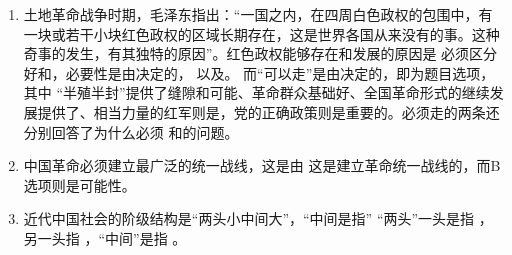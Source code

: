 \begin{enumerate}[align=hang, start=1]
	
	\item 
	土地革命战争时期，毛泽东指出：``一国之内，在四周白色政权的包围中，有一块或若干小块红色政权的区域长期存在，这是世界各国从来没有的事。这种奇事的发生，有其独特的原因''。红色政权能够存在和发展的原因是
	\note 必须区分好和，必要性是由决定的，
	以及。
	而``可以走''是由决定的，即为题目选项，其中 ``半殖半封''提供了缝隙和可能、革命群众基础好、全国革命形式的继续发展提供了、相当力量的红军则是，党的正确政策则是重要的。必须走的两条还分别回答了为什么必须 和的问题。
	
	\item 
	中国革命必须建立最广泛的统一战线，这是由
	\note  这是建立革命统一战线的，而B选项则是可能性。
	
	\item 
	近代中国社会的阶级结构是``两头小中间大''，``中间是指'' 
	\note \tq``两头''一头是指 ，另一头指 ，``中间''是指 。
	
	
	
\end{enumerate}